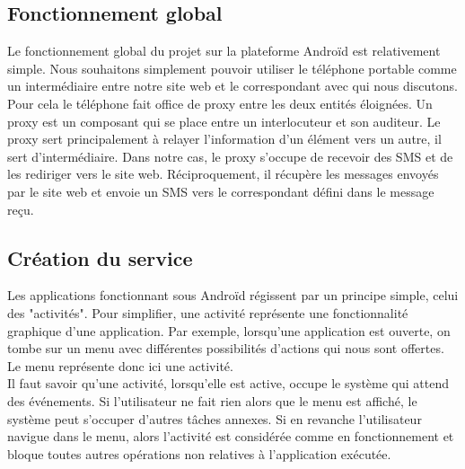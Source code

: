 \subsection{Fonctionnement global}
 
Le fonctionnement global du projet sur la plateforme Androïd est relativement simple. Nous souhaitons
simplement pouvoir utiliser le téléphone portable comme un intermédiaire entre notre site web et le 
correspondant avec qui nous discutons. Pour cela le téléphone fait office de proxy entre les deux 
entités éloignées. Un proxy est un composant qui se place entre un interlocuteur et son auditeur. Le 
proxy sert principalement à relayer l'information d'un élément vers un autre, il sert d'intermédiaire.
Dans notre cas, le proxy s'occupe de recevoir des SMS et de les rediriger vers le site web. 
Réciproquement, il récupère les messages envoyés par le site web et envoie un SMS vers le correspondant
défini  dans le message reçu.
\\
 
 
 
\subsection{Création du service}
 
Les applications fonctionnant sous Androïd régissent par un principe simple, celui des "activités".
Pour simplifier, une activité représente une fonctionnalité graphique d'une application. Par exemple,
lorsqu'une application est ouverte, on tombe sur un menu avec différentes possibilités d'actions 
qui nous sont offertes. Le menu représente donc ici une activité.
\\
 
 
Il faut savoir qu’une activité, lorsqu'elle est active, occupe le système qui attend des événements.
Si l'utilisateur ne fait rien alors que le menu est affiché, le système peut s'occuper d'autres 
tâches annexes. Si en revanche l'utilisateur navigue dans le menu, alors l'activité est considérée
comme en fonctionnement et bloque toutes autres opérations non relatives à l'application exécutée.
\\
 
